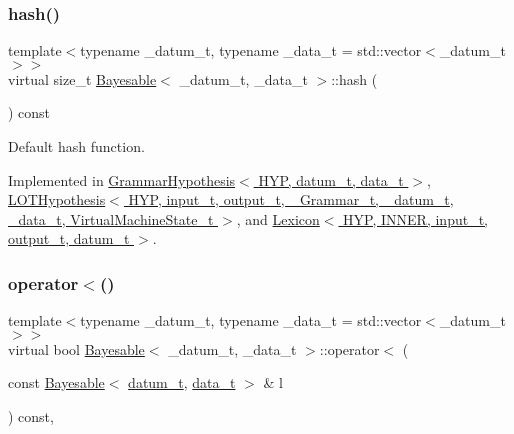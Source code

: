 \subsubsection{\texorpdfstring{hash()}{hash()}}
{\footnotesize\ttfamily template$<$typename \+\_\+datum\+\_\+t, typename \+\_\+data\+\_\+t = std\+::vector$<$\+\_\+datum\+\_\+t$>$$>$ \\
virtual size\+\_\+t \hyperlink{class_bayesable}{Bayesable}$<$ \+\_\+datum\+\_\+t, \+\_\+data\+\_\+t $>$\+::hash (\begin{DoxyParamCaption}{ }\end{DoxyParamCaption}) const\hspace{0.3cm}{\ttfamily [pure virtual]}}



Default hash function. 



Implemented in \hyperlink{class_grammar_hypothesis_a55297e7d1dac48158efa012445b93137}{Grammar\+Hypothesis$<$ H\+Y\+P, datum\+\_\+t, data\+\_\+t $>$}, \hyperlink{class_l_o_t_hypothesis_a7c33d51f8d81762b1eca7f86b596236a}{L\+O\+T\+Hypothesis$<$ H\+Y\+P, input\+\_\+t, output\+\_\+t, \+\_\+\+Grammar\+\_\+t, \+\_\+datum\+\_\+t, \+\_\+data\+\_\+t, Virtual\+Machine\+State\+\_\+t $>$}, and \hyperlink{class_lexicon_afbefa510e623ee4a407a1e1e04f42fb2}{Lexicon$<$ H\+Y\+P, I\+N\+N\+E\+R, input\+\_\+t, output\+\_\+t, datum\+\_\+t $>$}.

\mbox{\label{class_bayesable_ac356e7e5b11c266b8442064186dbe89d}} 
\subsubsection{\texorpdfstring{operator$<$()}{operator<()}}
{\footnotesize\ttfamily template$<$typename \+\_\+datum\+\_\+t, typename \+\_\+data\+\_\+t = std\+::vector$<$\+\_\+datum\+\_\+t$>$$>$ \\
virtual bool \hyperlink{class_bayesable}{Bayesable}$<$ \+\_\+datum\+\_\+t, \+\_\+data\+\_\+t $>$\+::operator$<$ (\begin{DoxyParamCaption}\item[{const \hyperlink{class_bayesable}{Bayesable}$<$ \hyperlink{class_bayesable_a9f1a6c0cd7855550fa10b1a8f13a5867}{datum\+\_\+t}, \hyperlink{class_bayesable_aa2788c4d7718c0a824e1d28c4c98f921}{data\+\_\+t} $>$ \&}]{l }\end{DoxyParamCaption}) const\hspace{0.3cm}{\ttfamily [inline]}, {\ttfamily [virtual]}}

